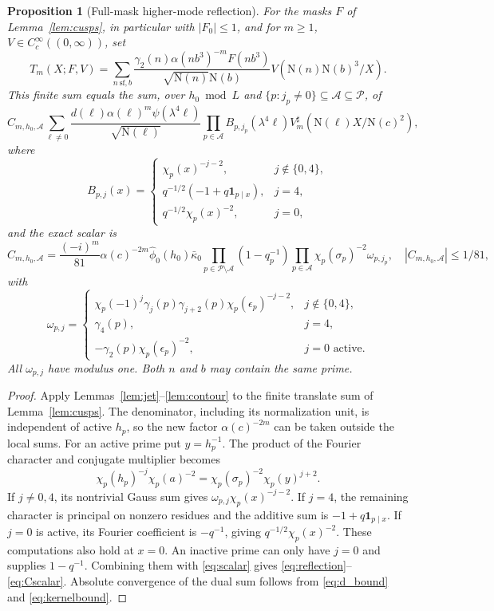 \documentclass[11pt,a4paper]{article}
\numberwithin{equation}{section}
\newtheorem{proposition}[theorem]{Proposition}
\theoremstyle{definition}
\theoremstyle{remark}
\newcommand{\N}{\mathrm N}
\newcommand{\ind}{\mathbf 1}
\newcommand{\wt}{\widehat}
\begin{document}
\begin{proposition}[Full-mask higher-mode reflection]\label{prop:reflection}
For the masks $F$ of Lemma~\ref{lem:cusps}, in particular with $|F_0|\le1$, and for $m\ge1$, $V\in C_c^\infty((0,\infty))$, set
\[
 T_m(X;F,V)=\sum_{n\ \mathrm{sf},b}\frac{\gamma_2(n)\alpha(nb^3)^{-m}F(nb^3)}{\sqrt{\N(n)}\N(b)}
 V(\N(n)\N(b)^3/X).
\]
This finite sum equals the sum, over $h_0\bmod L$ and
$\{p:j_p\ne0\}\subseteq\mathcal A\subseteq\mathcal P$, of
\begin{equation}\label{eq:reflection}
 C_{m,h_0,\mathcal A}\sum_{\ell\ne0}
 \frac{d(\ell)\alpha(\ell)^m\psi(\lambda^4\ell)}{\sqrt{\N(\ell)}}
 \prod_{p\in\mathcal A}B_{p,j_p}(\lambda^4\ell)
 V_m^\sharp(\N(\ell)X/\N(c)^2),
\end{equation}
where
\begin{equation}\label{eq:Bpj}
 B_{p,j}(x)=\begin{cases}
 \chi_p(x)^{-j-2},&j\notin\{0,4\},\\
 q^{-1/2}(-1+q\ind_{p\mid x}),&j=4,\\
 q^{-1/2}\chi_p(x)^{-2},&j=0,
 \end{cases}
\end{equation}
and the exact scalar is
\begin{equation}\label{eq:Cscalar}
 C_{m,h_0,\mathcal A}=\frac{(-i)^m}{81}\alpha(c)^{-2m}\wt\phi_0(h_0)\bar\kappa_0
 \prod_{p\in\mathcal P\setminus\mathcal A}(1-q_p^{-1})
 \prod_{p\in\mathcal A}\chi_p(\sigma_p)^{-2}\omega_{p,j_p},\quad |C_{m,h_0,\mathcal A}|\le1/81,
\end{equation}
with
\[
 \omega_{p,j}=\begin{cases}
 \chi_p(-1)^j\gamma_j(p)\gamma_{j+2}(p)\chi_p(\epsilon_p)^{-j-2},&j\notin\{0,4\},\\
 \gamma_4(p),&j=4,\\
 -\gamma_2(p)\chi_p(\epsilon_p)^{-2},&j=0\text{ active}.
 \end{cases}
\]
All $\omega_{p,j}$ have modulus one. Both $n$ and $b$ may contain the same prime.
\end{proposition}
\begin{proof}
Apply Lemmas~\ref{lem:jet}--\ref{lem:contour} to the finite translate sum of Lemma~\ref{lem:cusps}. The denominator, including its normalization unit, is independent of active $h_p$, so the new factor $\alpha(c)^{-2m}$ can be taken outside the local sums. For an active prime put $y=h_p^{-1}$. The product of the Fourier character and conjugate multiplier becomes
\[
 \chi_p(h_p)^{-j}\chi_p(a)^{-2}=\chi_p(\sigma_p)^{-2}\chi_p(y)^{j+2}.
\]
If $j\ne0,4$, its nontrivial Gauss sum gives $\omega_{p,j}\chi_p(x)^{-j-2}$. If $j=4$, the remaining character is principal on nonzero residues and the additive sum is $-1+q\ind_{p\mid x}$. If $j=0$ is active, its Fourier coefficient is $-q^{-1}$, giving $q^{-1/2}\chi_p(x)^{-2}$. These computations also hold at $x=0$. An inactive prime can only have $j=0$ and supplies $1-q^{-1}$. Combining them with \eqref{eq:scalar} gives \eqref{eq:reflection}--\eqref{eq:Cscalar}. Absolute convergence of the dual sum follows from \eqref{eq:d_bound} and \eqref{eq:kernelbound}.
\end{proof}
\end{document}
